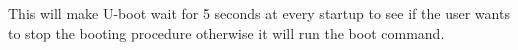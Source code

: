 \documentclass[11pt
  , a4paper
  , article
  , oneside
  , showtrims
]{memoir}
\begin{document}
This will make U-boot wait for 5 seconds at every startup to see if the user wants to stop the booting procedure otherwise it will run the boot command.



\clearpage
\backmatter
%
%
%

%

\fi
\end{document}
